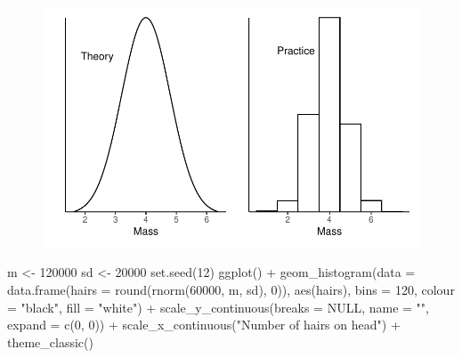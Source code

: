 \documentclass[
  letterpaper,
  DIV=11,
  numbers=noendperiod]{scrreprt}
\newenvironment{Shaded}{\begin{snugshade}}{\end{snugshade}}
\newcommand{\AttributeTok}[1]{\textcolor[rgb]{0.40,0.45,0.13}{#1}}
\newcommand{\ConstantTok}[1]{\textcolor[rgb]{0.56,0.35,0.01}{#1}}
\newcommand{\DecValTok}[1]{\textcolor[rgb]{0.68,0.00,0.00}{#1}}
\newcommand{\FunctionTok}[1]{\textcolor[rgb]{0.28,0.35,0.67}{#1}}
\newcommand{\NormalTok}[1]{\textcolor[rgb]{0.00,0.23,0.31}{#1}}
\newcommand{\OtherTok}[1]{\textcolor[rgb]{0.00,0.23,0.31}{#1}}
\newcommand{\SpecialCharTok}[1]{\textcolor[rgb]{0.37,0.37,0.37}{#1}}
\newcommand{\StringTok}[1]{\textcolor[rgb]{0.13,0.47,0.30}{#1}}
\begin{document}
\begin{figure}[H]

{\centering \includegraphics{ideas_about_data_files/figure-pdf/unnamed-chunk-3-1.pdf}

}

\end{figure}

\begin{Shaded}
\begin{Highlighting}[]
\NormalTok{m }\OtherTok{\textless{}{-}} \DecValTok{120000}
\NormalTok{sd }\OtherTok{\textless{}{-}} \DecValTok{20000}
\FunctionTok{set.seed}\NormalTok{(}\DecValTok{12}\NormalTok{)}
\FunctionTok{ggplot}\NormalTok{() }\SpecialCharTok{+}
  \FunctionTok{geom\_histogram}\NormalTok{(}\AttributeTok{data =} \FunctionTok{data.frame}\NormalTok{(}\AttributeTok{hairs =} \FunctionTok{round}\NormalTok{(}\FunctionTok{rnorm}\NormalTok{(}\DecValTok{60000}\NormalTok{, m, sd), }\DecValTok{0}\NormalTok{)),}
                 \FunctionTok{aes}\NormalTok{(hairs),}
                 \AttributeTok{bins =} \DecValTok{120}\NormalTok{, }\AttributeTok{colour =} \StringTok{"black"}\NormalTok{, }\AttributeTok{fill =} \StringTok{"white"}\NormalTok{) }\SpecialCharTok{+}
  \FunctionTok{scale\_y\_continuous}\NormalTok{(}\AttributeTok{breaks =} \ConstantTok{NULL}\NormalTok{, }\AttributeTok{name =} \StringTok{""}\NormalTok{,}
                     \AttributeTok{expand =} \FunctionTok{c}\NormalTok{(}\DecValTok{0}\NormalTok{, }\DecValTok{0}\NormalTok{)) }\SpecialCharTok{+}
  \FunctionTok{scale\_x\_continuous}\NormalTok{(}\StringTok{"Number of hairs on head"}\NormalTok{) }\SpecialCharTok{+}
  \FunctionTok{theme\_classic}\NormalTok{()}
\end{Highlighting}
\end{Shaded}
\end{document}
